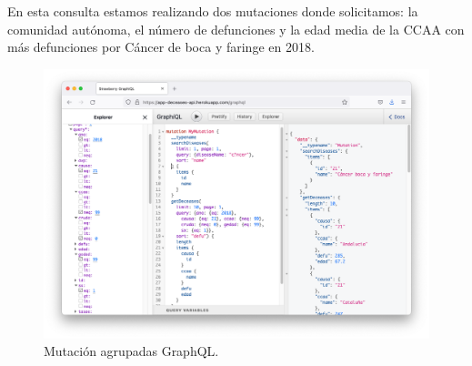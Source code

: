 En esta consulta estamos realizando dos mutaciones donde solicitamos: la comunidad autónoma,
el número de defunciones y la edad media de la CCAA con más defunciones por Cáncer de boca
y faringe en 2018.
\FloatBarrier
\begin{figure}[h]
	\centering
	\includegraphics[width=\textwidth]{doc/logos/imgs/ejemplo5.png}
	\caption{ Mutación agrupadas GraphQL. }
\end{figure}
\FloatBarrier
